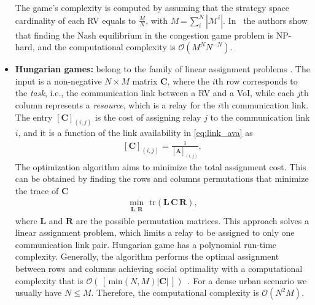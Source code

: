 \documentclass[journal]{IEEEtran}
\begin{document}
\begin{itemize}[wide]
    The game's complexity is computed by assuming that the strategy space cardinality of each RV equals to $\frac{M}{N}$, with $M$\,=\,$ \sum_i^{N} |\mathcal{M}^i|$.
    In~\cite{meyers2008complexity} the authors show that finding the Nash equilibrium in the congestion game problem is NP-hard, and the computational complexity is $\mathcal{O}\left(M^{N}N^{-N}\right)$.
    
    \item \textbf{Hungarian games:} belong to the family of linear assignment problems
    \cite{burkard1999linear}. The input is a non-negative $N \times M$ matrix $\mathbf{C}$, where the $i$th row corresponds to the \textit{task}, i.e., the communication link between a RV and a VoI, while each $j$th column represents a \textit{resource}, which is a relay for the $i$th communication link. 
    The entry $\left[\mathbf{C}\right]_{(i,j)}$ is the cost of assigning relay $j$ to the communication link $i$, and it is a function of the link availability in \eqref{eq:link_ava} as
    \begin{align} \label{costHG}
        \left[\mathbf{C}\right]_{(i,j)} = \frac{1}{  \left[\mathbf{\bar{A}}\right]_{(i,j)}},
    \end{align}
    The optimization algorithm aims to minimize the total assignment cost. This can be obtained by finding the rows and columns permutations that minimize the trace of $\mathbf{C}$ %
    \begin{align}
        \min_{\mathbf{L},\mathbf{R}}  \text{ tr} (\mathbf{L}\,\mathbf{C}\,\mathbf{R}),
    \end{align}
    where $\mathbf{L}$ and $\mathbf{R}$ are the possible permutation matrices.
    This approach solves a linear assignment problem, which limits a relay to be assigned to only one communication link pair.
    Hungarian game has a polynomial run-time complexity. Generally, the algorithm performs the optimal assignment between rows and columns achieving social optimality with a computational complexity that is 
    $\mathcal{O}\left(\,\left[\,\text{min}(N,M)\left|\mathbf{C}\right|\,\right]\right)$~\cite{wang2007study}.
    For a dense urban scenario we usually have $N \leq M$. Therefore, the computational complexity is $\mathcal{O}(N^{2}M)$.
    
\end{itemize}
\end{document}
